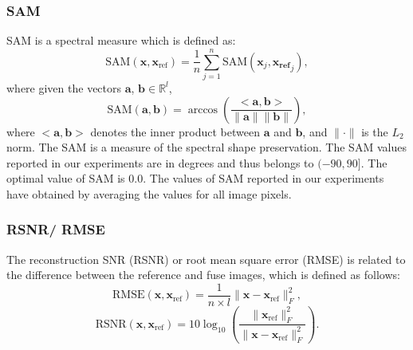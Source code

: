\documentclass[journal]{IEEEtran}
\begin{document}
\subsubsection{SAM}  SAM is a spectral measure which is defined as:
    \begin{equation}
        \text{SAM}(\mathbf{x}, \mathbf{x}_{\text{ref}}) = \frac{1}{n} \sum_{j=1}^{n} \text{SAM}(\mathbf{x}_j, \mathbf{{x}_{\text{ref}}}_j),
    \end{equation}
    where given the vectors $\mathbf{a}$, $\mathbf{b} \in \mathbb{R}^{l}$,
    \begin{equation}
        \text{SAM}(\mathbf{a}, \mathbf{b}) = \arccos{\left( \frac{<\mathbf{a}, \mathbf{b}>}{\lVert \mathbf{a}\rVert \lVert\mathbf{b}\rVert} \right)},
    \end{equation}
    where $<\mathbf{a}, \mathbf{b}>$ denotes the inner product between $\mathbf{a}$ and $\mathbf{b}$, and $\lVert \cdot \rVert$ is the $L_2$ norm. The SAM is a measure of the spectral shape preservation. The SAM values reported in our experiments are in degrees and thus belongs to $(-90, 90]$. The optimal value of SAM is $0.0$. The values of SAM reported in our experiments have obtained by averaging the values for all image pixels.
    
\subsubsection{RSNR/ RMSE} The reconstruction SNR (RSNR) or root mean square error (RMSE) is related to the difference between the reference and fuse images, which is defined as follows:
    \begin{equation}
        \text{RMSE}(\mathbf{x}, \mathbf{x}_{\text{ref}}) = \frac{1}{n \times l} \rVert \mathbf{x} - \mathbf{x}_{\text{ref}} \lVert^2_F,
    \end{equation}
    \begin{equation}
        \text{RSNR}(\mathbf{x}, \mathbf{x}_{\text{ref}}) = 10 \log_{10} \left( \frac{\lVert \mathbf{x}_{\text{ref}} \rVert^2_F}{ \lVert \mathbf{x} - \mathbf{x}_{\text{ref}}  \rVert^2_F  } \right).
    \end{equation}
    
\end{document}
